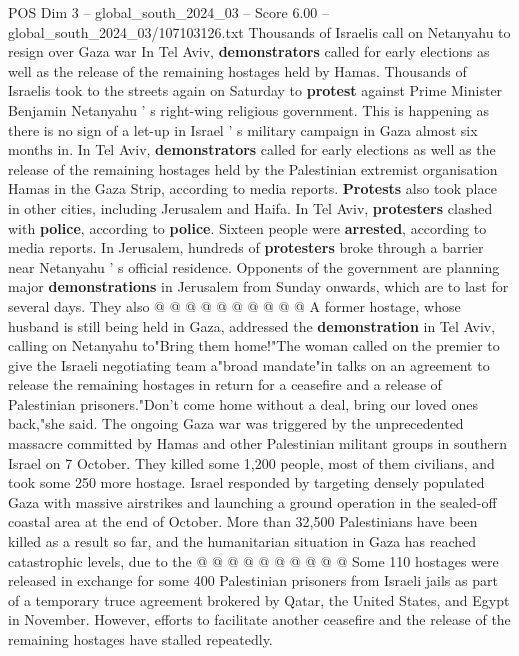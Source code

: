 \begin{textsample}{POS Dim 3 – global\_south\_2024\_03 – Score 6.00 – global\_south\_2024\_03/107103126.txt}  \label{ex:f3_pos_424}
Thousands of Israelis call on Netanyahu to resign over Gaza war In Tel Aviv, \textbf{demonstrators} called for early elections as well as the release of the remaining hostages held by Hamas.
Thousands of Israelis took to the streets again on Saturday to \textbf{protest} against Prime Minister Benjamin Netanyahu ' s right-wing religious government.
This is happening as there is no sign of a let-up in Israel ' s military campaign in Gaza almost six months in.
In Tel Aviv, \textbf{demonstrators} called for early elections as well as the release of the remaining hostages held by the Palestinian extremist organisation Hamas in the Gaza Strip, according to media reports. \textbf{Protests} also took place in other cities, including Jerusalem and Haifa.
In Tel Aviv, \textbf{protesters} clashed with \textbf{police}, according to \textbf{police}.
Sixteen people were \textbf{arrested}, according to media reports.
In Jerusalem, hundreds of \textbf{protesters} broke through a barrier near Netanyahu ' s official residence.
Opponents of the government are planning major \textbf{demonstrations} in Jerusalem from Sunday onwards, which are to last for several days.
They also @ @ @ @ @ @ @ @ @ @ A former hostage, whose husband is still being held in Gaza, addressed the \textbf{demonstration} in Tel Aviv, calling on Netanyahu to"Bring them home!"The woman called on the premier to give the Israeli negotiating team a"broad mandate"in talks on an agreement to release the remaining hostages in return for a ceasefire and a release of Palestinian prisoners."Don't come home without a deal, bring our loved ones back,"she said.
The ongoing Gaza war was triggered by the unprecedented massacre committed by Hamas and other Palestinian militant groups in southern Israel on 7 October.
They killed some 1,200 people, most of them civilians, and took some 250 more hostage.
Israel responded by targeting densely populated Gaza with massive airstrikes and launching a ground operation in the sealed-off coastal area at the end of October.
More than 32,500 Palestinians have been killed as a result so far, and the humanitarian situation in Gaza has reached catastrophic levels, due to the @ @ @ @ @ @ @ @ @ @ Some 110 hostages were released in exchange for some 400 Palestinian prisoners from Israeli jails as part of a temporary truce agreement brokered by Qatar, the United States, and Egypt in November.
However, efforts to facilitate another ceasefire and the release of the remaining hostages have stalled repeatedly.

\end{textsample}
